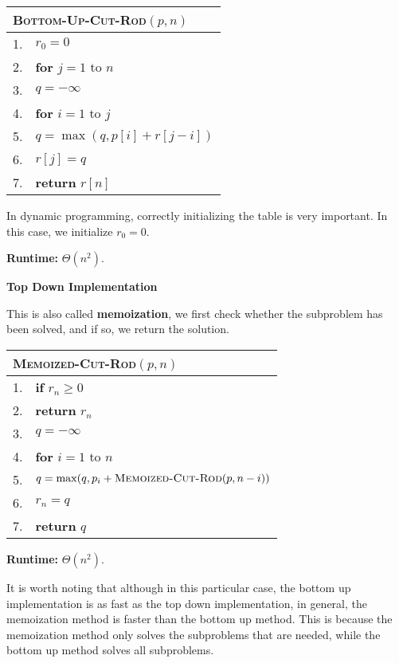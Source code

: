 \documentclass[a4paper,12pt]{article}
\begin{document}
\begin{center}
	\begin{tabular}{rl}
		\toprule
		\multicolumn{2}{l}{\textsc{Bottom-Up-Cut-Rod}$(p, n)$} \\
		\midrule
		1. & $r_0 = 0$ \\
		2. & \textbf{for} $j = 1$ to $n$ \\
		3. & \quad $q = -\infty$ \\
		4. & \quad \textbf{for} $i = 1$ to $j$ \\
		5. & \quad \quad $q = \max(q, p[i] + r[j - i])$ \\
		6. & \quad $r[j] = q$ \\
		7. & \textbf{return} $r[n]$ \\
		\bottomrule
	\end{tabular}
\end{center}

In dynamic programming, correctly initializing the table is very important.
In this case, we initialize $r_0 = 0$.

\textbf{Runtime:}
$\Theta(n^2)$.

\textbf{Top Down Implementation}

This is also called \textbf{memoization}, we first check whether the subproblem has been solved, and if so, we return the solution.

\begin{center}
	\begin{tabular}{rl}
		\toprule
		\multicolumn{2}{l}{\textsc{Memoized-Cut-Rod}$(p, n)$} \\
		\midrule
		1. & \textbf{if} $r_n \geq 0$ \\
		2. & \quad \textbf{return} $r_n$ \\
		3. & $q = -\infty$ \\
		4. & \textbf{for} $i = 1$ to $n$ \\
		5. & \quad $q = \max(q, p_i + \textsc{Memoized-Cut-Rod}(p, n - i))$ \\
		6. & $r_n = q$ \\
		7. & \textbf{return} $q$ \\
		\bottomrule
	\end{tabular}
\end{center}

\textbf{Runtime:}
$\Theta(n^2)$.

It is worth noting that although in this particular case, the bottom up implementation is as fast as the top down implementation, in general, the memoization method is faster than the bottom up method.
This is because the memoization method only solves the subproblems that are needed, while the bottom up method solves all subproblems.
\end{document}
